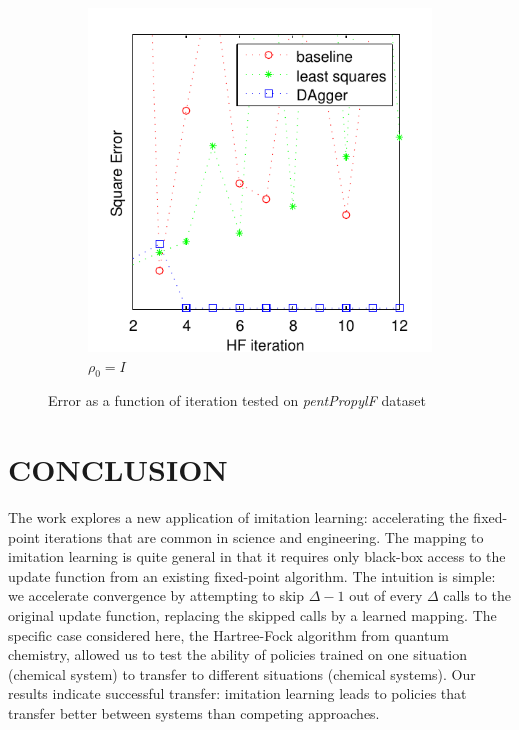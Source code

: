 \documentclass[twoside,11pt]{article}
\begin{document}
\begin{figure}[h!]
\begin{subfigure}{.5\textwidth}
  \includegraphics[scale=0.7]{propylsub_peye_test_12iter.pdf}
  \caption{$\rho_0 = I$}
  \label{fig:propSubI}
\end{subfigure}
\caption{Error as a function of iteration tested on \textit{pentPropylF} dataset}
\label{fig:testpropSub}
\end{figure}


\section{CONCLUSION}

The work explores a new application of imitation learning: accelerating the fixed-point iterations that are common in science and engineering. The mapping to imitation learning is quite general in that it requires only black-box access to the update function from an existing fixed-point algorithm.  The intuition is simple: we accelerate convergence by attempting to skip $\Delta-1$ out of every $\Delta$ calls to the original update function, replacing the skipped calls by a learned mapping.
The specific case considered here, the Hartree-Fock algorithm from quantum chemistry, allowed us to test the ability of policies trained on one situation (chemical system) to transfer to different situations (chemical systems). Our results  indicate successful transfer: imitation learning leads to policies that transfer better between systems than competing approaches.
\end{document}
